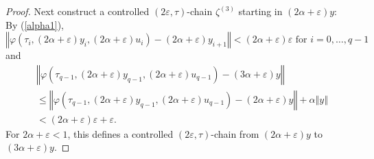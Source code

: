 \documentclass{siamltex}%
\begin{document}
\begin{proof}
Next construct a controlled $(2\varepsilon,\tau)$-chain $\zeta^{(3)}$ starting
in $(2\alpha+\varepsilon)y$: By (\ref{alpha1}),%
\[
\left\Vert \varphi(\tau_{i},(2\alpha+\varepsilon)y_{i},(2\alpha+\varepsilon
)u_{i})-(2\alpha+\varepsilon)y_{i+1}\right\Vert <(2\alpha+\varepsilon
)\varepsilon\text{ for }i=0,\ldots,q-1
\]
and%
\begin{align*}
&  \left\Vert \varphi(\tau_{q-1},(2\alpha+\varepsilon)y_{q-1},(2\alpha
+\varepsilon)u_{q-1})-(3\alpha+\varepsilon)y\right\Vert \\
&  \leq\left\Vert \varphi(\tau_{q-1},(2\alpha+\varepsilon)y_{q-1}%
,(2\alpha+\varepsilon)u_{q-1})-(2\alpha+\varepsilon)y\right\Vert
+\alpha\left\Vert y\right\Vert \\
&  <(2\alpha+\varepsilon)\varepsilon+\varepsilon.
\end{align*}
For $2\alpha+\varepsilon<1$, this defines a controlled $(2\varepsilon,\tau
)$-chain from $(2\alpha+\varepsilon)y$ to $(3\alpha+\varepsilon)y$.


\end{proof}
\end{document}
